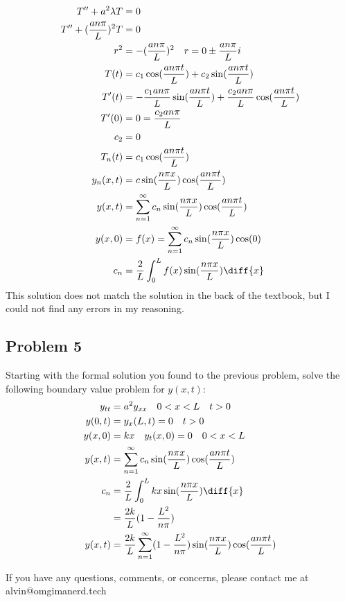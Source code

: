 \documentclass{math}
\begin{document}
\begin{align*}
  T''+a^2\lambda T &= 0 \\
  T''+(\frac{an\pi}{L})^2T &= 0 \\
  r^2 &= -(\frac{an\pi}{L})^2 \quad r = 0\pm\frac{an\pi}{L}i \\
  T(t) &= c_1\cos(\frac{an\pi t}{L})+c_2\sin(\frac{an\pi t}{L}) \\
  T'(t) &= -\frac{c_1an\pi}{L}\sin(\frac{an\pi t}{L})+
    \frac{c_2an\pi}{L}\cos(\frac{an\pi t}{L}) \\
  T'(0) &= 0 = \frac{c_2an\pi}{L} \\
  c_2 &= 0 \\
  T_n(t) &= c_1\cos(\frac{an\pi t}{L}) \\
  y_n(x,t) &= c\sin(\frac{n\pi x}{L})\cos(\frac{an\pi t}{L}) \\
  y(x,t) &= \sum_{n=1}^{\infty}
    c_n\sin(\frac{n\pi x}{L})\cos(\frac{an\pi t}{L}) \\
  y(x,0) &= f(x) = \sum_{n=1}^{\infty}c_n\sin(\frac{n\pi x}{L})\cos(0) \\
  c_n &= \frac{2}{L}\int_{0}^{L}f(x)\sin(\frac{n\pi x}{L})\diff{x}
\end{align*}
This solution does not match the solution in the back of the textbook, but I
could not find any errors in my reasoning.

\subsection*{Problem 5}
Starting with the formal solution you found to the previous problem, solve the
following boundary value problem for \( y(x,t) \):
\begin{align*}
  y_{tt} &= a^2y_{xx} \quad 0<x<L \quad t>0 \\
  y(0,t) &= y_x(L,t) = 0 \quad t>0 \\
  y(x,0) &= kx \quad y_t(x,0) = 0 \quad 0<x<L \\
  y(x,t) &= \sum_{n=1}^{\infty}
    c_n\sin(\frac{n\pi x}{L})\cos(\frac{an\pi t}{L}) \\
  c_n &= \frac{2}{L}\int_{0}^{L}kx\sin(\frac{n\pi x}{L})\diff{x} \\
  &= \frac{2k}{L}(1-\frac{L^2}{n\pi}) \\
  y(x,t) &= \frac{2k}{L}\sum_{n=1}^{\infty}(1-\frac{L^2}{n\pi})
    \sin(\frac{n\pi x}{L})\cos(\frac{an\pi t}{L})
\end{align*}

\begin{center}
  If you have any questions, comments, or concerns, please contact me at
  alvin@omgimanerd.tech
\end{center}
\end{document}
